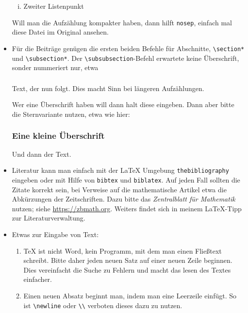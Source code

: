 \begin{refsection}
\begin{itemize}[topsep=1em]
\begin{enumerate}[(i), nosep]
	\item
	Zweiter Listenpunkt

\end{enumerate}
Will man die Aufzählung kompakter haben, dann hilft \texttt{nosep}, einfach mal diese Datei im Original ansehen.

\item
Für die Beiträge genügen die ersten beiden Befehle für Abschnitte, \dh \texttt{\textbackslash section*} und \texttt{\textbackslash subsection*}.
Der \texttt{\textbackslash subsubsection}-Befehl erwartete keine Überschrift, sonder nummeriert nur, etwa

\subsubsection{} Text, der nun folgt. 
Dies macht Sinn bei längeren Aufzählungen. 

Wer eine Überschrift haben will dann halt diese eingeben. 
Dann aber bitte die Sternvariante nutzen, etwa wie hier:

\subsubsection*{Eine kleine Überschrift} Und dann der Text.


\item
Literatur kann man einfach mit der \LaTeX{} Umgebung \texttt{thebibliography} eingeben oder mit Hilfe von  \texttt{bibtex} und \texttt{biblatex}.
Auf jeden Fall sollten die Zitate korrekt sein, \dh bei Verweise auf die mathematische Artikel etwa die Abkürzungen der Zeitschriften.
Dazu bitte das \emph{Zentralblatt für Mathematik} nutzen; siehe \href{https://zbmath.org}{https://zbmath.org}.
Weiters findet sich in meinem \LaTeX-Tipp zur Literaturverwaltung. 

\item
Etwas zur Eingabe von Text:

\begin{enumerate}[--]
	\item 
	\TeX{} ist nicht Word, \dh kein Programm, mit dem man einen Fließtext schreibt. 
	Bitte daher jeden neuen Satz auf einer neuen Zeile beginnen.
	Dies vereinfacht die Suche zu Fehlern und macht das lesen des Textes einfacher.
	
	\item
	Einen neuen Absatz beginnt man, indem man eine Leerzeile einfügt. 
	So ist \texttt{\textbackslash newline} oder \texttt{\textbackslash \textbackslash} verboten dieses dazu zu nutzen.
	

\end{enumerate}
\end{itemize}
\end{refsection}
